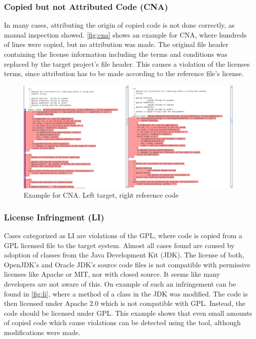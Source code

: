 \subsubsection*{Copied but not Attributed Code (CNA)}
In many cases, attributing the origin of copied code is not done correctly, as manual inspection showed.
\autoref{fig:cna} shows an example for CNA, where hundreds of lines were copied, but no attribution was made.
The original file header containing the license information including the terms and conditions was replaced by the target project's file header.
This causes a violation of the licenses terms, since attribution has to be made according to the reference file's license.
\begin{figure}[htpb]
	\centering
	\includegraphics[width=\linewidth, trim={1mm 3,8cm 0 0}, clip]{figures/cna.png}
	\caption{Example for CNA. Left target, right reference code}\label{fig:cna}
\end{figure}

\newpage
\subsubsection*{License Infringment (LI)}
Cases categorized as LI are violations of the GPL, where code is copied from a GPL licensed file to the target system.
Almost all cases found are caused by adoption of classes from the Java Development Kit (JDK).
The license of both, OpenJDK's and Oracle JDK's source code files is not compatible with permissive licenses like Apache or MIT, nor with closed source.
It seems like many developers are not aware of this.
On example of such an infringement can be found in \autoref{fig:li}, where a method of a class in the JDK was modified.
The code is then licensed under Apache 2.0 which is not compatible with GPL.
Instead, the code should be licensed under GPL.
This example shows that even small amounts of copied code which cause violations can be detected using the tool, although modifications were made.

